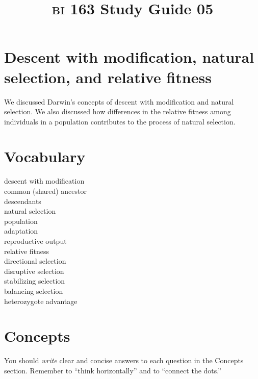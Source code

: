 \documentclass[letterpaper]{tufte-handout}
\title{{\scshape bi} 163 Study Guide 05}
\date{} %
\begin{document}
\maketitle	%

\section*{Descent with modification, natural selection, and relative fitness}

We discussed Darwin's concepts of descent with modification and natural selection. We also discussed how differences in the relative fitness among individuals in a population contributes to the process of natural selection.

\section*{Vocabulary}

\vspace{-1\baselineskip}
\begin{multicols}{2}
descent with modification\\
common (shared) ancestor \\
descendants \\
natural selection \\
population \\
adaptation \\
reproductive output \\
relative fitness \\
directional selection\\
disruptive selection\\
stabilizing selection\\
balancing selection\\
heterozygote advantage
\end{multicols}

\section*{Concepts}

You should \emph{write} clear and concise answers to each question in the Concepts section.  Remember to ``think horizontally'' and to ``connect the dots.'' 
\end{document}
